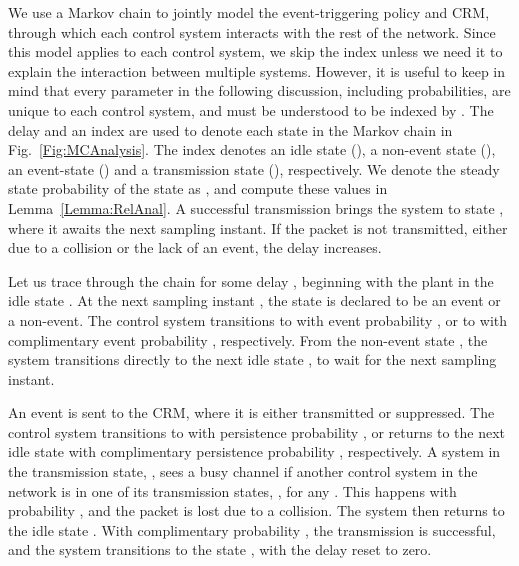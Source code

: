 \documentclass[twocolumn]{autart}
\begin{document}
We use a Markov chain to jointly model the event-triggering policy and CRM, through which each control system interacts with the rest of the network. Since this model applies to each control system, we skip the index  unless we need it to explain the interaction between multiple systems. However, it is useful to keep in mind that every parameter in the following discussion, including probabilities, are unique to each control system, and must be understood to be indexed by . The delay  and an index  are used to denote each state in the Markov chain in Fig.~\ref{Fig:MCAnalysis}. The index  denotes an idle state (), a non-event state (), an event-state () and a transmission state (), respectively. We denote the steady state probability of the state  as , and compute these values in Lemma~\ref{Lemma:RelAnal}. A successful transmission brings the system to state , where it awaits the next sampling instant. If the packet is not transmitted, either due to a collision or the lack of an event, the delay increases.

Let us trace through the chain for some delay , beginning with the plant in the idle state . At the next sampling instant , the state  is declared to be an event or a non-event. The control system transitions to  with event probability , or to  with complimentary event probability , respectively. From the non-event state , the system transitions directly to the next idle state , to wait for the next sampling instant.

An event is sent to the CRM, where it is either transmitted or suppressed. The control system transitions to  with persistence probability , or returns to the next idle state  with complimentary persistence probability , respectively. A system in the transmission state, , sees a busy channel if another control system in the network is in one of its transmission states, , for any . This happens with probability , and the packet is lost due to a collision. The system then returns to the idle state . With complimentary probability , the transmission is successful, and the system transitions to the state , with the delay reset to zero.
\end{document}
